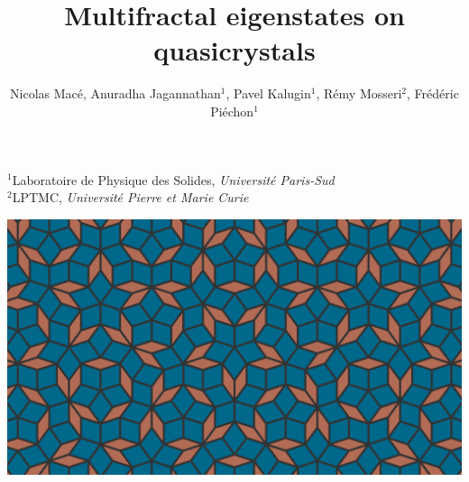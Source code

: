 \begin{frame}
\title{Multifractal eigenstates on quasicrystals}

\author{Nicolas Macé, Anuradha Jagannathan$^1$, Pavel Kalugin$^1$, Rémy Mosseri$^2$, Frédéric Piéchon$^1$}

\institute %
{
  $^1$Laboratoire de Physique des Solides, \emph{Université Paris-Sud} \\
  $^2$LPTMC, \emph{Université Pierre et Marie Curie}
}


\titlepage

\btVFill
\centering
\includegraphics[width=.45\textwidth]{img/cover.png}
\end{frame}
